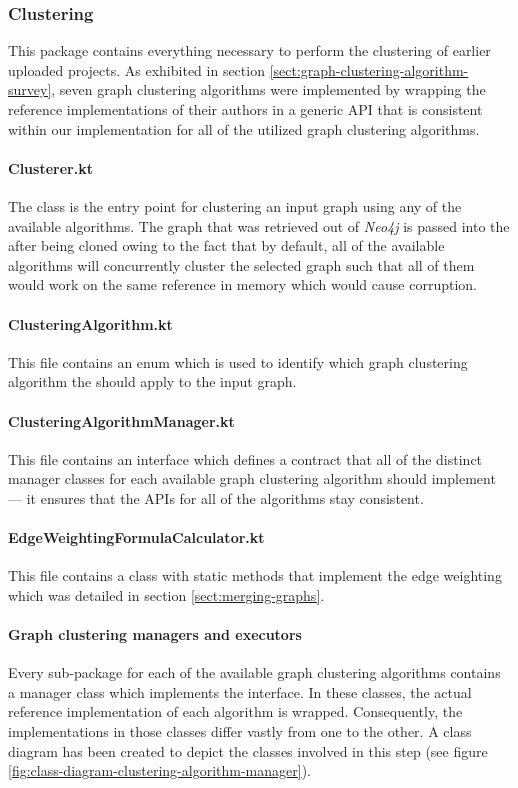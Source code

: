 \documentclass[12pt,a4paper]{report}
\begin{document}
\subsubsection{Clustering}
This package contains everything necessary to perform the clustering of
earlier uploaded projects. As exhibited in section \ref{sect:graph-clustering-algorithm-survey},
seven graph clustering algorithms were implemented by wrapping the
reference implementations of their authors in a generic API that is consistent
within our implementation for all of the utilized graph clustering algorithms.

\paragraph{Clusterer.kt}
The  class is the entry point for clustering an input graph
using any of the available algorithms. The graph that was retrieved out of
\textit{Neo4j} is passed into the  after being cloned owing
to the fact that by default, all of the available algorithms will concurrently
cluster the selected graph such that all of them would work on the same
reference in memory which would cause corruption.

\paragraph{ClusteringAlgorithm.kt}
This file contains an enum which is used to identify which graph clustering
algorithm the  should apply to the input graph.

\paragraph{ClusteringAlgorithmManager.kt}
This file contains an interface which defines a contract that all of the
distinct manager classes for each available graph clustering algorithm
should implement --- it ensures that the APIs for all of the algorithms stay consistent.

\paragraph{EdgeWeightingFormulaCalculator.kt}
This file contains a class with static methods that implement the edge weighting
which was detailed in section \ref{sect:merging-graphs}.

\paragraph{Graph clustering managers and executors}
Every sub-package for each of the available graph clustering algorithms contains
a manager class which implements the  interface.
In these classes, the actual reference implementation of each algorithm is wrapped.
Consequently, the implementations in those classes differ vastly from one to the other.
A class diagram has been created to depict the classes involved in this step
(see figure \ref{fig:class-diagram-clustering-algorithm-manager}).
\end{document}
